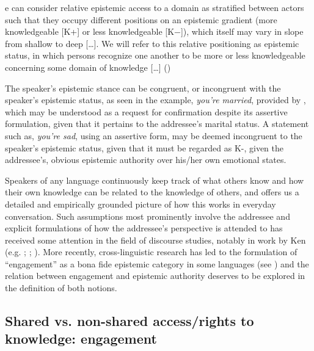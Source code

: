 \documentclass[output=paper]{langsci/langscibook}
\begin{document}
\begin{displayquote}
	[W]e can consider relative epistemic access to a domain as stratified between actors such that they occupy different positions on an epistemic gradient (more knowledgeable [K+] or less knowledgeable [K−]), which itself may vary in slope from shallow to deep […]. We will refer to this relative positioning as epistemic status, in which persons recognize one another to be more or less knowledgeable concerning some domain of knowledge […] (\citealt[32]{Heritage2012})
\end{displayquote}


The speaker's epistemic stance can be congruent, or incongruent with the speaker’s epistemic status, as seen in the example, \emph{you’re married}, provided by \citeauthor{Heritage2012}, which may be understood as a request for confirmation despite its assertive formulation, given that it pertains to the addressee’s marital status. A statement such as, \emph{you’re sad}, using an assertive form, may be deemed incongruent to the speaker’s epistemic status, given that it must be regarded as K-, given the addressee’s, obvious epistemic authority over his/her own emotional states.

Speakers of any language continuously keep track of what others know and how their own knowledge can be related to the knowledge of others, and \citeauthor{Heritage2012} offers us a detailed and empirically grounded picture of how this works in everyday conversation. Such assumptions most prominently involve the addressee and explicit formulations of how the addressee’s perspective is attended to has received some attention in the field of discourse studies, notably in work by Ken \citeauthor{Hyland1999} (e.g. \citeyear{Hyland1999}; \citeyear{Hyland2001}; \citeyear{Hyland2005}). More recently, cross-linguistic research has led to the formulation of “engagement” as a bona fide epistemic category in some languages (see \citealt{Evansetal2017a}) and the relation between engagement and epistemic authority deserves to be explored in the definition of both notions.

\subsection{Shared vs. non-shared access/rights to knowledge: engagement}\label{s:hb3-3}
\end{document}
